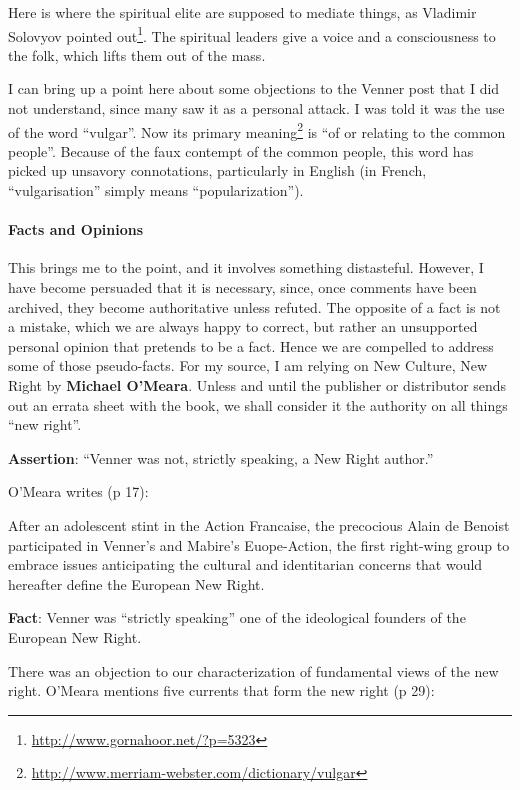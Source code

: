 Here is where the spiritual elite are supposed to mediate things, as Vladimir Solovyov pointed out\footnote{\url{http://www.gornahoor.net/?p=5323}}. The spiritual leaders give a voice and a consciousness to the folk, which lifts them out of the mass.

I can bring up a point here about some objections to the Venner post that I did not understand, since many saw it as a personal attack. I was told it was the use of the word ``vulgar''. Now its primary meaning\footnote{\url{http://www.merriam-webster.com/dictionary/vulgar}} is ``of or relating to the common people''. Because of the faux contempt of the common people, this word has picked up unsavory connotations, particularly in English (in French, ``vulgarisation'' simply means ``popularization'').

\paragraph{Facts and Opinions}


This brings me to the point, and it involves something distasteful. However, I have become persuaded that it is necessary, since, once comments have been archived, they become authoritative unless refuted. The opposite of a fact is not a mistake, which we are always happy to correct, but rather an unsupported personal opinion that pretends to be a fact. Hence we are compelled to address some of those pseudo-facts. For my source, I am relying on New Culture, New Right by \textbf{Michael O'Meara}. Unless and until the publisher or distributor sends out an errata sheet with the book, we shall consider it the authority on all things ``new right''.

\textbf{Assertion}: ``Venner was not, strictly speaking, a New Right author.''

O'Meara writes (p 17):

\begin{quotex}
After an adolescent stint in the Action Francaise, the precocious Alain de Benoist participated in Venner's and Mabire's Euope-Action, the first right-wing group to embrace issues anticipating the cultural and identitarian concerns that would hereafter define the European New Right.
\end{quotex}


\textbf{Fact}: Venner was ``strictly speaking'' one of the ideological founders of the European New Right.

There was an objection to our characterization of fundamental views of the new right. O'Meara mentions five currents that form the new right (p 29):

